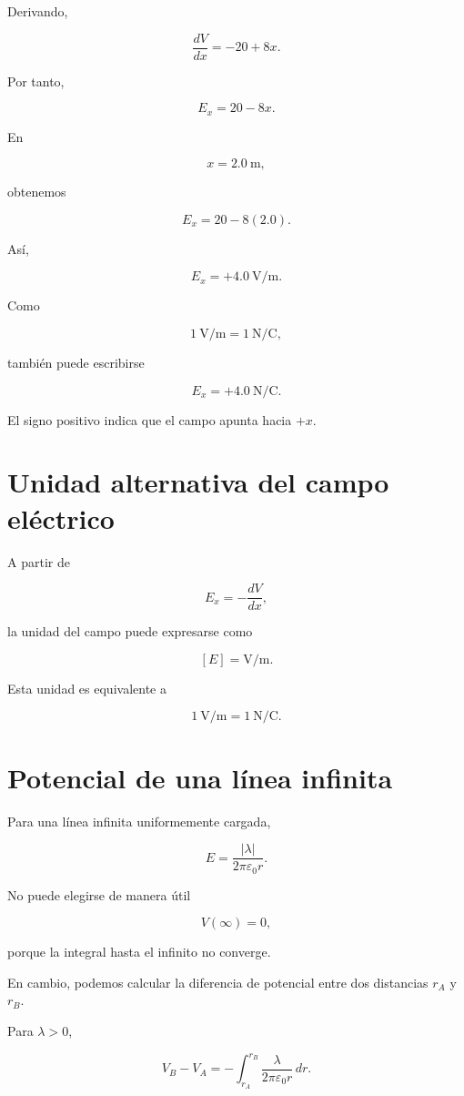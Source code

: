 Derivando,

\[
\frac{dV}{dx}=-20+8x.
\]

Por tanto,

\[
E_x=20-8x.
\]

En

\[
x=\SI{2.0}{\metre},
\]

obtenemos

\[
E_x=20-8(2.0).
\]

Así,

\[
\boxed{
E_x=+\SI{4.0}{\volt\per\metre}
}.
\]

Como

\[
\SI{1}{\volt\per\metre}
=
\SI{1}{\newton\per\coulomb},
\]

también puede escribirse

\[
\boxed{
E_x=+\SI{4.0}{\newton\per\coulomb}
}.
\]

El signo positivo indica que el campo apunta hacia \(+x\).


\section{Unidad alternativa del campo eléctrico}

A partir de

\[
E_x=-\frac{dV}{dx},
\]

la unidad del campo puede expresarse como

\[
\boxed{
[E]=\si{\volt\per\metre}
}.
\]

Esta unidad es equivalente a

\[
\boxed{
\SI{1}{\volt\per\metre}
=
\SI{1}{\newton\per\coulomb}
}.
\]


\section{Potencial de una línea infinita}

Para una línea infinita uniformemente cargada,

\[
E=\frac{|\lambda|}{2\pi\varepsilon_0r}.
\]

No puede elegirse de manera útil

\[
V(\infty)=0,
\]

porque la integral hasta el infinito no converge.

En cambio, podemos calcular la diferencia de potencial entre dos distancias
\(r_A\) y \(r_B\).

Para \(\lambda>0\),

\[
V_B-V_A
=
-\int_{r_A}^{r_B}
\frac{\lambda}{2\pi\varepsilon_0r}\,dr.
\]

